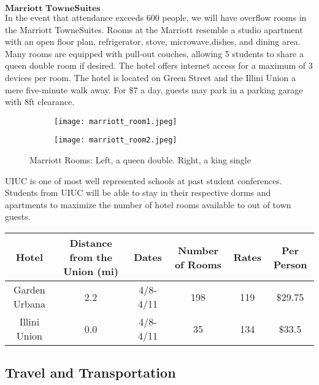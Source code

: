 $\textbf{Marriott TowneSuites}$\\
In the event that attendance exceeds 600 people, we will have overflow rooms in the Marriott TowneSuites. Rooms at the Marriott resemble a studio apartment with an open floor plan, refrigerator, stove, microwave,dishes, and dining area. Many rooms are equipped with pull-out couches, allowing 5 students to share a queen double room if desired. The hotel offers internet access for a maximum of 3 devices per room. The hotel is located on Green Street and the Illini Union a mere five-minute walk away. For $\$7$ a day, guests may park in a parking garage with 8ft clearance.\\
\begin{figure}[H]
	\centering
	\begin{subfigure}{0.5\textwidth}
		\centering
		\texttt{[image: marriott\_room1.jpeg]}
	\end{subfigure}%
	\begin{subfigure}{0.5\textwidth}
		\centering
		\texttt{[image: marriott\_room2.jpeg]}
	\end{subfigure}
	\caption{Marriott Rooms: Left, a queen double. Right, a king single}		
\end{figure} 

UIUC is one of most well represented schools at past student conferences. Students from UIUC will be able to stay in their respective dorms and apartments to maximize the number of hotel rooms available to out of town guests. 

\begin{tabular}{cccccc}
\hline\hline
Hotel & Distance from the Union (mi) & Dates & Number of Rooms & Rates & Per Person\\
\hline\hline
Garden Urbana & 2.2  & 4/8-4/11 & 198 & 119 & $\$$29.75\\
Illini Union & 0.0 & 4/8-4/11 & 35 & 134 & $\$$33.5\\
\end{tabular}

\newpage
\subsection{Travel and Transportation}

